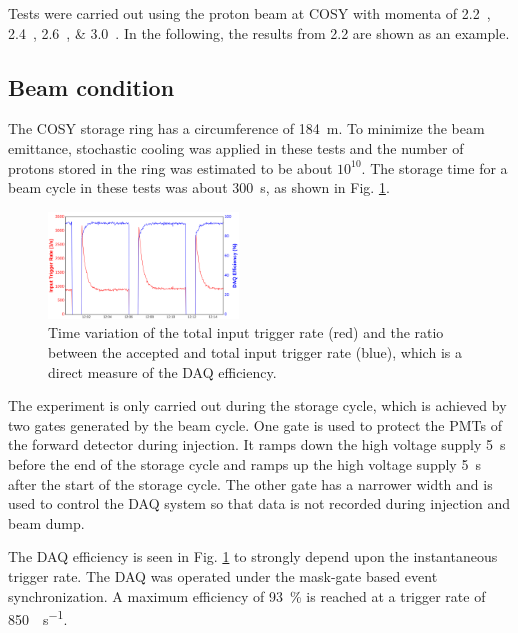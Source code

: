 \documentclass[number,5p]{elsarticle}
\begin{document}
Tests were carried out using the proton beam at COSY with momenta of
\SIlist[list-units=single]{2.2;2.4;2.6;3.0}{\momentum}.
In the following, the results from \SI{2.2}{\momentum} are shown as an example.

\subsection{Beam condition}
\label{sec:beam}
The COSY storage ring has a circumference of \SI{184}{\meter}.
To minimize the beam emittance, stochastic cooling \cite{cooling} was applied in
these tests and the number of protons stored in the ring was estimated to be about $10^{10}$. 
The storage time for a beam cycle in these tests was about \SI{300}{\second}, as shown in Fig. \ref{fig:beam}.
\begin{figure}[h]
  \centering
  \includegraphics[width=0.45\textwidth]{./daq_efficiency.png}
  \caption{Time variation of the total input trigger rate (red) and the ratio between the accepted and total input trigger rate (blue), which is a direct measure of the DAQ efficiency.}
  \label{fig:beam}
\end{figure}

The experiment is only carried out during the storage cycle, which is achieved by two
gates generated by the beam cycle.
One gate is used to protect the PMTs of the forward detector during injection.
It ramps down the high voltage supply \SI{5}{\second} before the end of the
storage cycle and ramps up the high voltage supply \SI{5}{\second} after the start of the storage cycle.
The other gate has a narrower width and is used to control the DAQ system so
that data is not recorded during injection and beam dump.

The DAQ efficiency is seen in Fig. \ref{fig:beam} to strongly depend upon the
instantaneous trigger rate.
The DAQ was operated under the mask-gate based event synchronization.
A maximum efficiency of \SI{93}{\percent} is reached at a trigger rate of \SI{850}{\event\per\second}.
\end{document}
